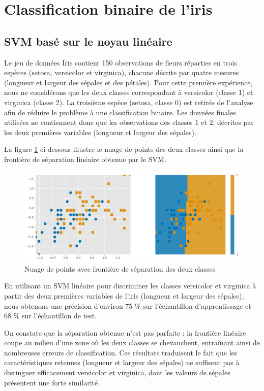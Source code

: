 \documentclass{rapport}
\begin{document}
\section{Classification binaire de l’iris }

\subsection{SVM basé sur le noyau linéaire}
Le jeu de données Iris contient 150 observations de fleurs réparties en trois espèces (setosa, versicolor et virginica), chacune décrite par quatre mesures (longueur et largeur des sépales et des pétales). Pour cette première expérience, nous ne considérons que les deux classes correspondant à versicolor (classe 1) et virginica (classe 2). La troisième espèce (setosa, classe 0) est retirée de l’analyse afin de réduire le problème à une classification binaire. Les données finales utilisées ne contiennent donc que les observations des classes 1 et 2, décrites par les deux premières variables (longueur et largeur des sépales). 

La figure \ref{fig:placeholder1} ci-dessous illustre le nuage de points des deux classes ainsi que la frontière de séparation linéaire obtenue par le SVM.

\begin{figure}[H]
    \centering
    \includegraphics[width=0.9\linewidth]{logos/nuageiris.png}
    \caption{Nuage de points avec frontière de séparation des deux classes}
    \label{fig:placeholder1}
\end{figure}


En utilisant un SVM linéaire pour discriminer les classes versicolor et virginica à partir des deux premières variables de l’iris (longueur et largeur des sépales), nous obtenons une précision d’environ 75 \% sur l’échantillon d’apprentissage et 68 \% sur l’échantillon de test.

On constate que la séparation obtenue n’est pas parfaite : la frontière linéaire coupe au milieu d’une zone où les deux classes se chevauchent, entraînant ainsi de nombreuses erreurs de classification. Ces résultats traduisent le fait que les caractéristiques retenues (longueur et largeur des sépales) ne suffisent pas à distinguer efficacement versicolor et virginica, dont les valeurs de sépales présentent une forte similarité.
    
\end{document}
